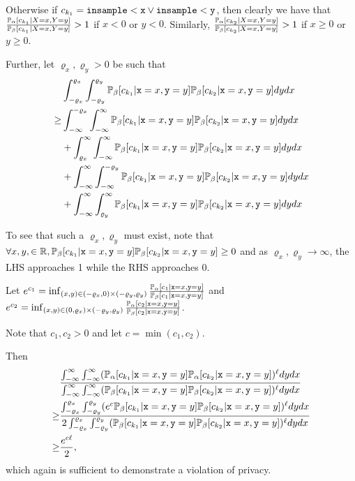 Otherwise if $c_{k_1} =\lguard[\texttt{x}]\lor \lguard[\texttt{y}]$, then clearly we have that $\frac{\PP_\alpha[c_{k_1}|X = x, Y=y]}{\PP_\beta[c_{k_1}|X = x, Y=y]}>1$ if $x< 0$ or $y<0$. Similarly, $\frac{\PP_\alpha[c_{k_2}|X = x, Y=y]}{\PP_\beta[c_{k_2}|X = x, Y=y]}>1$ if $x\geq 0$ or $y\geq 0$.

Further, let $\varrho_x, \varrho_y>0$ be such that \begin{align*}
	&\int_{-\varrho_x}^{\varrho_x}\int_{-\varrho_y}^{\varrho_y}\PP_\beta[c_{k_1}|\texttt{x}=x, \texttt{y}=y]\PP_\beta[c_{k_2}|\texttt{x}=x, \texttt{y}=y] dydx \\
	\geq& \int_{-\infty}^{-\varrho_x}\int_{-\infty}^{\infty}\PP_\beta[c_{k_1}|\texttt{x}=x, \texttt{y}=y]\PP_\beta[c_{k_2}|\texttt{x}=x, \texttt{y}=y] dydx \\
	&+ \int_{\varrho_x}^{\infty}\int_{-\infty}^{\infty}\PP_\beta[c_{k_1}|\texttt{x}=x, \texttt{y}=y]\PP_\beta[c_{k_2}|\texttt{x}=x, \texttt{y}=y] dydx \\
	& +\int_{-\infty}^{\infty}\int_{-\infty}^{-\varrho_y}\PP_\beta[c_{k_1}|\texttt{x}=x, \texttt{y}=y]\PP_\beta[c_{k_2}|\texttt{x}=x, \texttt{y}=y] dydx \\
	& +\int_{-\infty}^{\infty}\int_{\varrho_y}^{\infty}\PP_\beta[c_{k_1}|\texttt{x}=x, \texttt{y}=y]\PP_\beta[c_{k_2}|\texttt{x}=x, \texttt{y}=y] dydx
\end{align*}

To see that such a $\varrho_x, \varrho_y$ must exist, note that $\forall x, y,\in \RR, \PP_\beta[c_{k_1}|\texttt{x}=x, \texttt{y}=y]\PP_\beta[c_{k_2}|\texttt{x}=x, \texttt{y}=y]\geq 0$ and as $\varrho_x, \varrho_y\to\infty$, the LHS approaches 1 while the RHS approaches 0. 

Let $e^{c_1} = \inf_{(x, y)\in (-\varrho_x, 0)\times (-\varrho_y, \varrho_y)}\frac{\PP_\alpha[c_1|\texttt{x}=x, \texttt{y}=y]}{\PP_\beta[c_1|\texttt{x}=x, \texttt{y}=y]}$ and $e^{c_2} = \inf_{(x, y)\in (0, \varrho_x)\times (-\varrho_y, \varrho_y)}\frac{\PP_\alpha[c_2|\texttt{x}=x, \texttt{y}=y]}{\PP_\beta[c_2|\texttt{x}=x, \texttt{y}=y]}$.

Note that $c_1, c_2 >0$ and let $c = \min(c_1, c_2)$. 

Then \begin{align*}
	&\frac{\int_{-\infty}^\infty\int_{-\infty}^\infty(\PP_\alpha[c_{k_1}|\texttt{x}=x, \texttt{y}=y]\PP_\alpha[c_{k_2}|\texttt{x}=x, \texttt{y}=y])^\ell dydx}{\int_{-\infty}^\infty\int_{-\infty}^\infty(\PP_\beta[c_{k_1}|\texttt{x}=x, \texttt{y}=y]\PP_\beta[c_{k_2}|\texttt{x}=x, \texttt{y}=y])^\ell dydx}\\
	\geq &\frac{\int_{-\varrho_x}^{\varrho_x}\int_{-\varrho_y}^{\varrho_y}(e^c\PP_\beta[c_{k_1}|\texttt{x}=x, \texttt{y}=y]\PP_\beta[c_{k_2}|\texttt{x}=x, \texttt{y}=y])^\ell dydx}{2\int_{-\varrho_x}^{\varrho_x}\int_{-\varrho_y}^{\varrho_y}(\PP_\beta[c_{k_1}|\texttt{x}=x, \texttt{y}=y]\PP_\beta[c_{k_2}|\texttt{x}=x, \texttt{y}=y])^\ell dydx} \\
	\geq &\frac{e^{c\ell}}{2},
\end{align*}
which again is sufficient to demonstrate a violation of privacy. 

